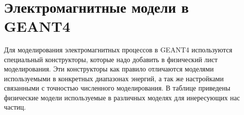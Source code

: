 ~\cite{bespalov2008, kolchuzkin1978, nemec1975}






  

\section{Электромагнитные модели в GEANT4 }\label{sec:theory/models}


Для моделирования электромагнитных процессов в GEANT4 используются специальный конструкторы, которые надо добавить в физический лист моделирования. Эти конструкторы как правило отличаются моделями используемыми в конкретных диапазонах энергий, а так же настройками связанными с точностью численного моделирования. В таблице приведены физические модели используемые в различных моделях для инересующих нас частиц.

\newpage

